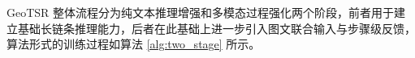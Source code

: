 GeoTSR 整体流程分为纯文本推理增强和多模态过程强化两个阶段，前者用于建立基础长链条推理能力，后者在此基础上进一步引入图文联合输入与步骤级反馈，算法形式的训练过程如算法 \ref{alg:two_stage} 所示。






